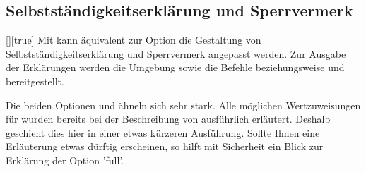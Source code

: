 \begin{Declaration*}{}
\begin{Declaration*}{}
\begin{Declaration*}{}
\subsection{Selbstständigkeitserklärung und Sperrvermerk}
%
%
%
\begin{Declaration}{[\PSet]}[true]%
\printdeclarationlist%
%
Mit  kann äquivalent zur Option  die 
Gestaltung von Selbstständigkeitserklärung und Sperrvermerk angepasst werden.
Zur Ausgabe der Erklärungen werden die Umgebung  
sowie die Befehle  beziehungsweise  und 
 bereitgestellt. 

Die beiden Optionen  und  ähneln sich sehr 
stark. Alle möglichen Wertzuweisungen für  wurden bereits 
bei der Beschreibung von  ausführlich erläutert. Deshalb 
geschieht dies hier in einer etwas kürzeren Ausführung. Sollte Ihnen eine 
Erläuterung etwas dürftig erscheinen, so hilft mit Sicherheit ein Blick zur 
Erklärung der Option 'full'.


\end{Declaration}
\end{Declaration*}
\end{Declaration*}
\end{Declaration*}
